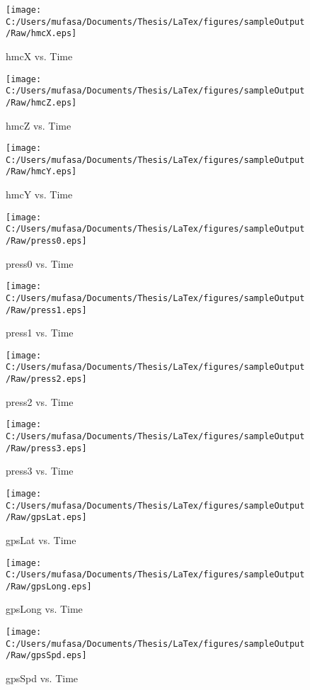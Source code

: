 \begin{figure}[H]
	\centering
	\caption{hmcX vs. Time}
		\texttt{[image: C:/Users/mufasa/Documents/Thesis/LaTex/figures/sampleOutput/Raw/hmcX.eps]}
\end{figure}
\begin{figure}[H]
	\centering
	\caption{hmcZ vs. Time}
		\texttt{[image: C:/Users/mufasa/Documents/Thesis/LaTex/figures/sampleOutput/Raw/hmcZ.eps]}
\end{figure}
\begin{figure}[H]
	\centering
	\caption{hmcY vs. Time}
		\texttt{[image: C:/Users/mufasa/Documents/Thesis/LaTex/figures/sampleOutput/Raw/hmcY.eps]}
\end{figure}
\begin{figure}[H]
	\centering
	\caption{press0 vs. Time}
		\texttt{[image: C:/Users/mufasa/Documents/Thesis/LaTex/figures/sampleOutput/Raw/press0.eps]}
\end{figure}
\begin{figure}[H]
	\centering
	\caption{press1 vs. Time}
		\texttt{[image: C:/Users/mufasa/Documents/Thesis/LaTex/figures/sampleOutput/Raw/press1.eps]}
\end{figure}
\begin{figure}[H]
	\centering
	\caption{press2 vs. Time}
		\texttt{[image: C:/Users/mufasa/Documents/Thesis/LaTex/figures/sampleOutput/Raw/press2.eps]}
\end{figure}
\begin{figure}[H]
	\centering
	\caption{press3 vs. Time}
		\texttt{[image: C:/Users/mufasa/Documents/Thesis/LaTex/figures/sampleOutput/Raw/press3.eps]}
\end{figure}
\begin{figure}[H]
	\centering
	\caption{gpsLat vs. Time}
		\texttt{[image: C:/Users/mufasa/Documents/Thesis/LaTex/figures/sampleOutput/Raw/gpsLat.eps]}
\end{figure}
\begin{figure}[H]
	\centering
	\caption{gpsLong vs. Time}
		\texttt{[image: C:/Users/mufasa/Documents/Thesis/LaTex/figures/sampleOutput/Raw/gpsLong.eps]}
\end{figure}
\begin{figure}[H]
	\centering
	\caption{gpsSpd vs. Time}
		\texttt{[image: C:/Users/mufasa/Documents/Thesis/LaTex/figures/sampleOutput/Raw/gpsSpd.eps]}
\end{figure}

